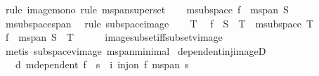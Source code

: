\begin{isabellebody}
\ {\isacharparenleft}{\kern0pt}rule\ image{\isacharunderscore}{\kern0pt}mono{\isacharcomma}{\kern0pt}\ rule\ m{}{\isachardot}{\kern0pt}span{\isacharunderscore}{\kern0pt}superset{\isacharparenright}{\kern0pt}\isanewline
\ \ \isamarkupfalse%
\ {\isachardoublequoteopen}m{}{\isachardot}{\kern0pt}subspace\ {\isacharparenleft}{\kern0pt}f\ {\isacharbackquote}{\kern0pt}\ m{}{\isachardot}{\kern0pt}span\ S{\isacharparenright}{\kern0pt}{\isachardoublequoteclose}\isanewline
\ \ \ \ \isamarkupfalse%
\ m{}{\isachardot}{\kern0pt}subspace{\isacharunderscore}{\kern0pt}span\ \isamarkupfalse%
\ {\isacharparenleft}{\kern0pt}rule\ subspace{\isacharunderscore}{\kern0pt}image{\isacharparenright}{\kern0pt}\isanewline
{}\isamarkupfalse%
\isanewline
\ \ \isamarkupfalse%
\ T\ \isamarkupfalse%
\ {\isachardoublequoteopen}f\ {\isacharbackquote}{\kern0pt}\ S\ {\isasymsubseteq}\ T{\isachardoublequoteclose}\ \ {\isachardoublequoteopen}m{}{\isachardot}{\kern0pt}subspace\ T{\isachardoublequoteclose}\ \isamarkupfalse%
\ \isamarkupfalse%
\ {\isachardoublequoteopen}f\ {\isacharbackquote}{\kern0pt}\ m{}{\isachardot}{\kern0pt}span\ S\ {\isasymsubseteq}\ T{\isachardoublequoteclose}\isanewline
\ \ \ \ \isamarkupfalse%
\ image{\isacharunderscore}{\kern0pt}subset{\isacharunderscore}{\kern0pt}iff{\isacharunderscore}{\kern0pt}subset{\isacharunderscore}{\kern0pt}vimage\ \isamarkupfalse%
\ {\isacharparenleft}{\kern0pt}metis\ subspace{\isacharunderscore}{\kern0pt}vimage\ m{}{\isachardot}{\kern0pt}span{\isacharunderscore}{\kern0pt}minimal{\isacharparenright}{\kern0pt}\isanewline
{}\isamarkupfalse%
%
\endisatagproof
{\isafoldproof}%
%
\isadelimproof
\isanewline
%
\endisadelimproof
\isanewline
{}\isamarkupfalse%
\ dependent{\isacharunderscore}{\kern0pt}inj{\isacharunderscore}{\kern0pt}imageD{\isacharcolon}{\kern0pt}\isanewline
\ \ \ d{\isacharcolon}{\kern0pt}\ {\isachardoublequoteopen}m{}{\isachardot}{\kern0pt}dependent\ {\isacharparenleft}{\kern0pt}f\ {\isacharbackquote}{\kern0pt}\ s{\isacharparenright}{\kern0pt}{\isachardoublequoteclose}\ \ i{\isacharcolon}{\kern0pt}\ {\isachardoublequoteopen}inj{\isacharunderscore}{\kern0pt}on\ f\ {\isacharparenleft}{\kern0pt}m{}{\isachardot}{\kern0pt}span\ s{\isacharparenright}{\kern0pt}{\isachardoublequoteclose}\isanewline

\end{isabellebody}
